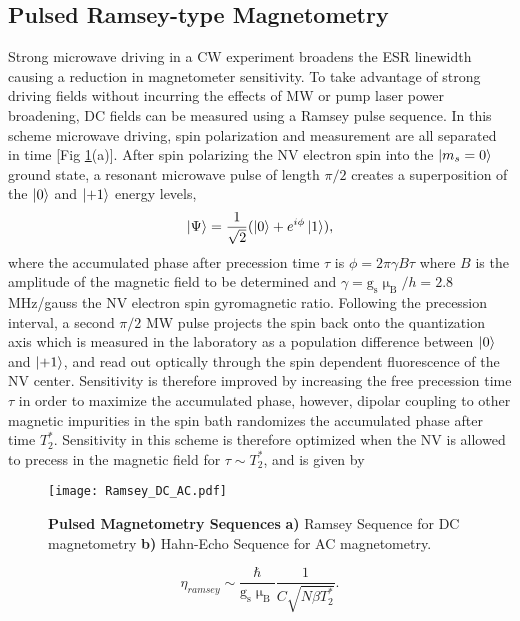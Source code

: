 
\subsection{Pulsed Ramsey-type Magnetometry} \label{Pulsed_Ramsey}

Strong microwave driving in a CW experiment broadens the ESR linewidth causing a reduction in magnetometer sensitivity. To take advantage of strong driving fields without incurring the effects of MW or pump laser power broadening, DC fields can be measured using a Ramsey pulse sequence. In this scheme microwave driving, spin polarization and measurement are all separated in time [Fig \ref{Fig_two}(a)]. After spin polarizing the NV electron spin into the $\ket{m_s = 0}$ ground state, a resonant microwave pulse of length $\pi/2$ creates a superposition of the $\ket{0}$ and $\ket{+1}$ energy levels,
\begin{equation}
\ket{\Psi} = \frac{1}{\sqrt{2}}(\ket{0} + e^{i\phi}\ket{1}),
\end{equation}
where the accumulated phase after precession time $\tau$ is $\phi = 2\pi \gamma B \tau$ where $B$ is the amplitude of the magnetic field to be determined and $\gamma = \text{g}_\text{s} \upmu_\text{B} / h = 2.8$ MHz/gauss the NV electron spin gyromagnetic ratio. Following the precession interval, a second $\pi/2$ MW pulse projects the spin back onto the quantization axis which is measured in the laboratory as a population difference between $\ket{0}$ and $\ket{+1}$, and read out optically through the spin dependent fluorescence of the NV center. Sensitivity is therefore improved by increasing the free precession time $\tau$ in order to maximize the accumulated phase, however, dipolar coupling to other magnetic impurities in the spin bath randomizes the accumulated phase after time $T_2^*$. Sensitivity in this scheme is therefore optimized when the NV is allowed to precess in the magnetic field for $\tau \sim T_2^*$, and is given by 
\begin{figure}[t!]
\centering
\texttt{[image: Ramsey\_DC\_AC.pdf]}  
\caption{\textbf{Pulsed Magnetometry Sequences} \textbf{a)} Ramsey Sequence for DC magnetometry \textbf{b)} Hahn-Echo Sequence for AC magnetometry.}
\label{Fig_two}
\end{figure}
\begin{equation}
\eta_{ramsey} \sim \frac{\hbar}{\text{g}_\text{s} \upmu_{\text{B}}} \frac{1}{C\sqrt{N \beta T_2^*}}.
\end{equation}
